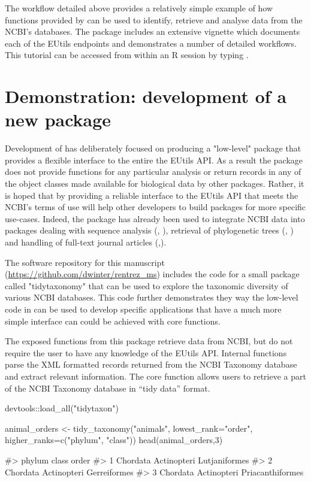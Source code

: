 The workflow detailed above provides a relatively simple example of how functions
provided by  can be used to identify, retrieve and analyse data
from the NCBI's databases. The package includes an extensive vignette which
documents each of the EUtils endpoints and demonstrates a number of detailed
workflows. This tutorial can be accessed from within an R session by typing 
.

\section{Demonstration: development of a new package}

Development of  has deliberately focused on producing a "low-level"
package that provides a flexible interface to the entire the EUtils API. As a 
result the package does not provide functions for any particular analysis
or return records in any of the object classes made available for biological
data by other packages. Rather, it is hoped that by providing a reliable interface
to the EUtils API that meets the NCBI's terms of use  will help 
other developers to build packages for more specific use-cases. Indeed, the
package has already been used to integrate NCBI data into packages dealing
with sequence analysis (, \citealt{genbankr}), retrieval of
phylogenetic trees (, \citealt{rotl}) and handling of
full-text journal articles (,\citealt{fulltext}).

The software repository for this manuscript
(\url{https://github.com/dwinter/rentrez_ms}) includes the code for a small
package called "tidytaxonomy" that can be used to explore the taxonomic
diversity of various NCBI databases. This code further  demonstrates they way the 
low-level code in  can be used to develop specific applications 
that have a much more simple interface can could be achieved with core 
 functions.

The exposed functions from this package retrieve data from NCBI, but do not
require the user to have any knowledge of the EUtils API. Internal functions
parse the XML formatted records returned from the NCBI Taxonomy database and
extract relevant information. The core function  allows 
users to retrieve a part of the NCBI  Taxonomy database in ``tidy data'' 
\citep{tidy-data} format.

\begin{example}
devtools::load_all("tidytaxon")

animal_orders <- tidy_taxonomy("animals", 
                               lowest_rank="order",
                               higher_ranks=c("phylum", "class"))
head(animal_orders,3)

#>     phylum       class            order
#> 1 Chordata Actinopteri    Lutjaniformes
#> 2 Chordata Actinopteri     Gerreiformes
#> 3 Chordata Actinopteri Priacanthiformes
\end{example}

